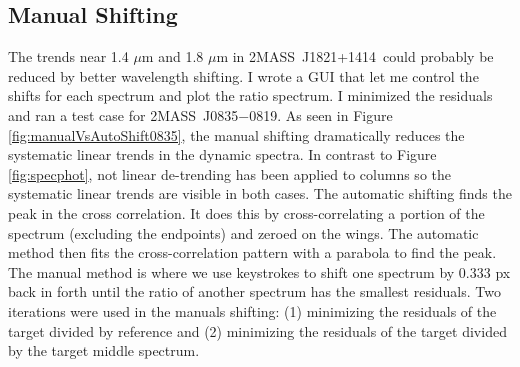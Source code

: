 \documentclass[manuscript]{aastex6}
\newcommand{\sha}{2MASS~J0835$-$0819}
\newcommand{\shb}{2MASS~J1821+1414}
\begin{document}
\clearpage
\pagebreak
\subsection{Manual Shifting}

The trends near 1.4 $\mu$m and 1.8 $\mu$m in \shb\ could probably be reduced by better wavelength shifting.
I wrote a GUI that let me control the shifts for each spectrum and plot the ratio spectrum.
I minimized the residuals and ran a test case for \sha.
As seen in Figure \ref{fig:manualVsAutoShift0835}, the manual shifting dramatically reduces the systematic linear trends in the dynamic spectra.
In contrast to Figure \ref{fig:specphot}, not linear de-trending has been applied to columns so the systematic linear trends are visible in both cases.
The automatic shifting finds the peak in the cross correlation.
It does this by cross-correlating a portion of the spectrum (excluding the endpoints) and zeroed on the wings. 
The automatic method then fits the cross-correlation pattern with a parabola to find the peak.
The manual method is where we use keystrokes to shift one spectrum by 0.333 px back in forth until the ratio of another spectrum has the smallest residuals.
Two iterations were used in the manuals shifting: (1) minimizing the residuals of the target divided by reference and (2) minimizing the residuals of the target divided by the target middle spectrum.
\end{document}
